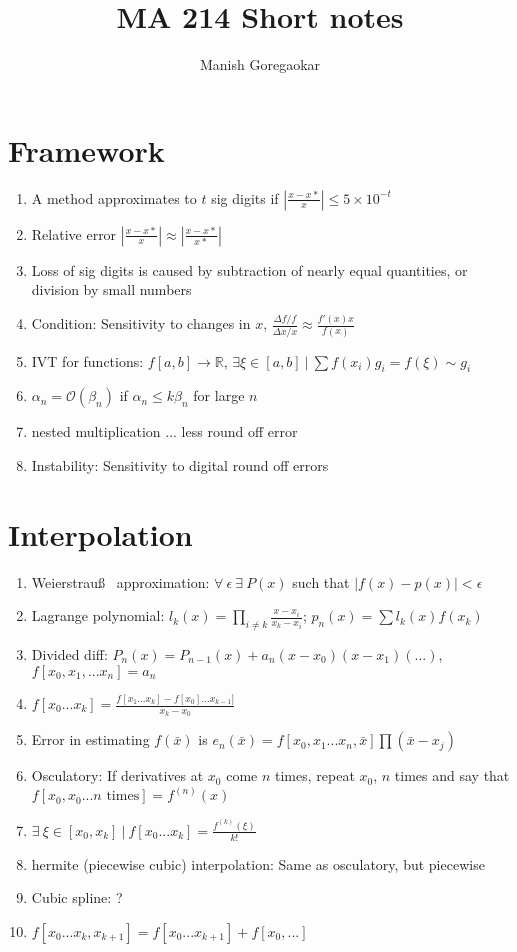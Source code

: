 \documentclass[12pt]{article}
\title{MA 214 Short notes}
\author{Manish Goregaokar}
\begin{document}
\maketitle
\section{Framework}
\begin{enumerate}
\item A method approximates to $t$ sig digits if $\left|\frac{x-x*}{x}\right|\leq 5\times 10^{-t}$
\item Relative error $\left|\frac{x-x*}{x}\right|\approx \left|\frac{x-x*}{x*}\right|$
\item Loss of sig digits is caused by subtraction of nearly equal quantities, or division by small numbers
\item Condition: Sensitivity to changes in $x$, $\frac{\Delta f/f}{\Delta x /x}\approx \frac{f'(x)x}{f(x)}$
\item IVT for functions: $f[a,b]\to\mathbb R$, $\exists \xi\in[a,b] ~|~\sum f(x_i)g_i=f(\xi)\sim g_i$
\item $\alpha_n =\mathcal O(\beta_n)$ if $\alpha_n\leq k\beta_n$ for large $n$
\item nested multiplication ... less round off error
\item Instability:  Sensitivity to digital round off errors

\end{enumerate}

\section{Interpolation}

\begin{enumerate}
\item Weierstrau\ss~ approximation: $\forall~\epsilon~\exists~P(x)$ such that $|f(x)-p(x)|<\epsilon$
\item Lagrange polynomial: $l_k(x)=\prod\limits_{i\neq k}\frac{x-x_i}{x_k-x_i}{}$; $p_n(x)=\sum l_k(x) f(x_k)$
\item Divided diff: $P_n(x)=P_{n-1}(x)+a_n(x-x_0)(x-x_1)(...)$, $f[x_0,x_1,...x_n]=a_n$
\item $f[x_0...x_k]=\frac{f[x_1...x_k]-f[x_0]...x_{k-1}]}{x_k-x_0}$
\item Error in estimating $f(\bar{x})$ is $e_n(\bar{x})=f[x_0,x_1...x_n,\bar{x}]\prod (\bar{x}-x_j)$
\item Osculatory: If derivatives at $x_0$ come $n$ times, repeat $x_0$, $n$ times and say that $f[x_0,x_0... n\text{ times}]=f^{(n)}(x)$
\item  $\exists ~\xi\in[x_0,x_k]~|~f[x_0...x_k]=\frac{f^{(k)}(\xi)}{k!}$
\item hermite (piecewise cubic) interpolation: Same as osculatory, but piecewise
\item Cubic spline: ?
\item $f[x_0...x_k,x_{k+1}]=f[x_0...x_{k+1}]+f[x_0,...]$
\end{enumerate}
\end{document}
